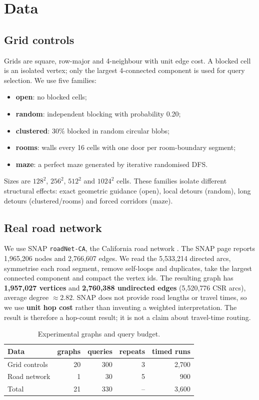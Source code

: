 \documentclass[conference,10pt]{IEEEtran}
\newcommand{\code}[1]{\texttt{#1}}
\begin{document}
\section{Data}
\label{sec:data}

\subsection{Grid controls}
Grids are square, row-major and 4-neighbour with unit edge cost.  A blocked cell
is an isolated vertex; only the largest 4-connected component is used for query
selection.  We use five families:
\begin{itemize}
  \item \textbf{open}: no blocked cells;
  \item \textbf{random}: independent blocking with probability 0.20;
  \item \textbf{clustered}: 30\% blocked in random circular blobs;
  \item \textbf{rooms}: walls every 16 cells with one door per room-boundary
        segment;
  \item \textbf{maze}: a perfect maze generated by iterative randomised DFS.
\end{itemize}
Sizes are $128^2$, $256^2$, $512^2$ and $1024^2$ cells.  These families isolate
different structural effects: exact geometric guidance (open), local detours
(random), long detours (clustered/rooms) and forced corridors (maze).

\subsection{Real road network}
We use SNAP \code{roadNet-CA}, the California road network
\cite{snap}.  The SNAP page reports 1,965,206 nodes and 2,766,607 edges.  We read
the 5,533,214 directed arcs, symmetrise each road segment, remove self-loops and
duplicates, take the largest connected component and compact the vertex ids.
The resulting graph has \textbf{1,957,027 vertices} and \textbf{2,760,388
undirected edges} (5,520,776 CSR arcs), average degree $\approx 2.82$.
SNAP does not provide road lengths or travel times, so we use \textbf{unit hop
cost} rather than inventing a weighted interpretation.  The result is therefore
a hop-count result; it is not a claim about travel-time routing.

\begin{table}[!t]
\centering
\caption{Experimental graphs and query budget.}
\label{tab:data}
\footnotesize
\setlength{\tabcolsep}{3pt}
\begin{tabular}{lrrrr}
\toprule
Data & graphs & queries & repeats & timed runs\\
\midrule
Grid controls & 20 & 300 & 3 & 2,700\\
Road network & 1 & 30 & 5 & 900\\
\midrule
Total & 21 & 330 & -- & 3,600\\
\bottomrule
\end{tabular}
\end{table}
\end{document}
